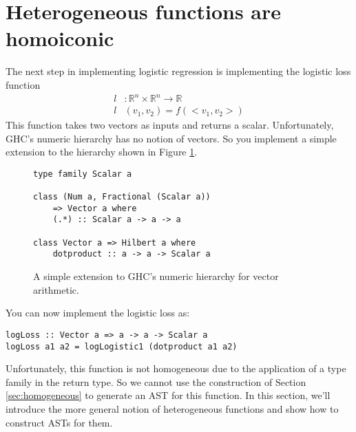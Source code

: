 \documentclass[preprint]{sigplanconf}
\theoremstyle{definition}
\begin{document}
\section{Heterogeneous functions are homoiconic}

The next step in implementing logistic regression is implementing the logistic loss function
\begin{align}
l &: \mathbb{R}^n \times \mathbb{R}^n \to \mathbb{R} \\
l &(v_1,v_2) = f(<v_1,v_2>)
\end{align}
This function takes two vectors as inputs and returns a scalar.
Unfortunately, GHC's numeric hierarchy has no notion of vectors.
So you implement a simple extension to the hierarchy shown in Figure \ref{code:vector}.

\begin{figure}
\begin{lstlisting}
type family Scalar a

class (Num a, Fractional (Scalar a))
    => Vector a where
    (.*) :: Scalar a -> a -> a

class Vector a => Hilbert a where
    dotproduct :: a -> a -> Scalar a
\end{lstlisting}
\caption{
    A simple extension to GHC's numeric hierarchy for vector arithmetic.
}
\label{code:vector}
\end{figure}

You can now implement the logistic loss as:
\begin{lstlisting}
logLoss :: Vector a => a -> a -> Scalar a
logLoss a1 a2 = logLogistic1 (dotproduct a1 a2)
\end{lstlisting}
Unfortunately, this function is not homogeneous due to the application of a type family in the return type.
So we cannot use the construction of Section \ref{sec:homogeneous} to generate an AST for this function.
In this section, we'll introduce the more general notion of heterogeneous functions and show how to construct ASTs for them.
\end{document}
